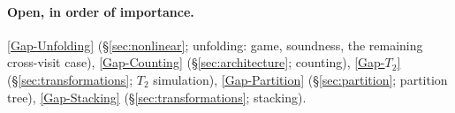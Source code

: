 \documentclass[11pt]{article}
\theoremstyle{plain}
\theoremstyle{definition}
\theoremstyle{remark}
\newcommand{\GapTtwo}{\hyperref[gap:T2]{[Gap-$T_2$]}}
\newcommand{\GapStacking}{\hyperref[gap:stacking]{[Gap-Stacking]}}
\newcommand{\GapPartition}{\hyperref[gap:ptree]{[Gap-Partition]}}
\newcommand{\GapUnfolding}{\hyperref[gap:unfold]{[Gap-Unfolding]}}
\newcommand{\GapCounting}{\hyperref[gap:count]{[Gap-Counting]}}
\begin{document}
\paragraph{Open, in order of importance.}
\GapUnfolding{} (\S\ref{sec:nonlinear}; unfolding: game, soundness,
the remaining cross-visit case), \GapCounting{}
(\S\ref{sec:architecture}; counting), \GapTtwo{}
(\S\ref{sec:transformations}; $T_2$ simulation), \GapPartition{}
(\S\ref{sec:partition}; partition tree), \GapStacking{}
(\S\ref{sec:transformations}; stacking).
\end{document}
